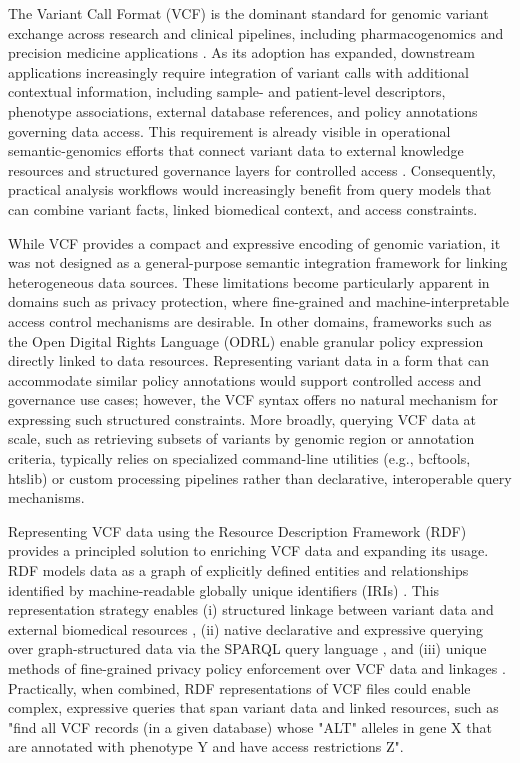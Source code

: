 \documentclass[unnumsec,webpdf,contemporary,large]{oup-authoring-template}
\begin{document}
The Variant Call Format (VCF) is the dominant standard for genomic variant exchange across research and clinical pipelines, including pharmacogenomics and precision medicine applications \cite{vcf_spec_2024,mcleod_cancer_2013,souche_recommendations_2022}. 
As its adoption has expanded, downstream applications increasingly require integration of variant calls with additional contextual information, including sample- and patient-level descriptors, phenotype associations, external database references, and policy annotations governing data access. 
This requirement is already visible in operational semantic-genomics efforts that connect variant data to external knowledge resources and structured governance layers for controlled access \cite{togovar_2022,sphn_semantic_2023,acl_2021}.
Consequently, practical analysis workflows would increasingly benefit from query models that can combine variant facts, linked biomedical context, and access constraints.

While VCF provides a compact and expressive encoding of genomic variation, it was not designed as a general-purpose semantic integration framework for linking heterogeneous data sources.
These limitations become particularly apparent in domains such as privacy protection, where fine-grained and machine-interpretable access control mechanisms are desirable. 
In other domains, frameworks such as the Open Digital Rights Language (ODRL) \cite{odrl_2018} enable granular policy expression directly linked to data resources. 
Representing variant data in a form that can accommodate similar policy annotations would support controlled access and governance use cases; however, the VCF syntax offers no natural mechanism for expressing such structured constraints. 
More broadly, querying VCF data at scale, such as retrieving subsets of variants by genomic region or annotation criteria, typically relies on specialized command-line utilities (e.g., bcftools, htslib) or custom processing pipelines rather than declarative, interoperable query mechanisms.

Representing VCF data using the Resource Description Framework (RDF) \cite{rdf} provides a principled solution to enriching VCF data and expanding its usage. 
RDF models data as a graph of explicitly defined entities and relationships identified by machine-readable globally unique identifiers (IRIs) \cite{rdf}.
This representation strategy enables (i) structured linkage between variant data and external biomedical resources \cite{bio2rdf_2008,sib_swiss_institute_of_bioinformatics_rdf_group_members_sib_2024}, (ii) native declarative and expressive querying over graph-structured data via the SPARQL query language \cite{sparqllang}, and (iii) unique methods of fine-grained privacy policy enforcement over VCF data and linkages \cite{odrl_2018,acl_2021}.
Practically, when combined, RDF representations of VCF files could enable complex, expressive queries that span variant data and linked resources, such as "find all VCF records (in a given database) whose "ALT" alleles in gene X that are annotated with phenotype Y and have access restrictions Z".
\end{document}

